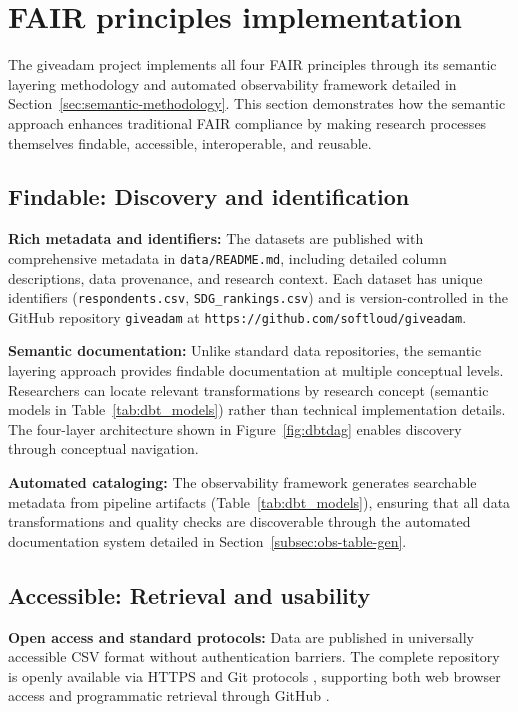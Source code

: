 \documentclass{article}
\begin{document}
\section{FAIR principles implementation}
\label{sec:fair}

The giveadam project implements all four FAIR principles \cite{wilkinson2016fair} through its semantic layering methodology and automated observability framework detailed in Section~\ref{sec:semantic-methodology}. This section demonstrates how the semantic approach enhances traditional FAIR compliance by making research processes themselves findable, accessible, interoperable, and reusable.

\subsection{Findable: Discovery and identification}

\textbf{Rich metadata and identifiers:} The datasets are published with comprehensive metadata in \texttt{data/README.md}, including detailed column descriptions, data provenance, and research context. Each dataset has unique identifiers (\texttt{respondents.csv}, \texttt{SDG\_rankings.csv}) and is version-controlled in the GitHub repository \texttt{giveadam} at \texttt{https://github.com/softloud/giveadam}.

\textbf{Semantic documentation:} Unlike standard data repositories, the semantic layering approach provides findable documentation at multiple conceptual levels. Researchers can locate relevant transformations by research concept (semantic models in Table~\ref{tab:dbt_models}) rather than technical implementation details. The four-layer architecture shown in Figure~\ref{fig:dbtdag} enables discovery through conceptual navigation.

\textbf{Automated cataloging:} The observability framework generates searchable metadata from pipeline artifacts (Table~\ref{tab:dbt_models}), ensuring that all data transformations and quality checks are discoverable through the automated documentation system detailed in Section~\ref{subsec:obs-table-gen}.

\subsection{Accessible: Retrieval and usability}

\textbf{Open access and standard protocols:} Data are published in universally accessible CSV format \cite{csv_rfc} without authentication barriers. The complete repository is openly available via HTTPS and Git protocols \cite{git}, supporting both web browser access and programmatic retrieval through GitHub \cite{github}.
\end{document}
